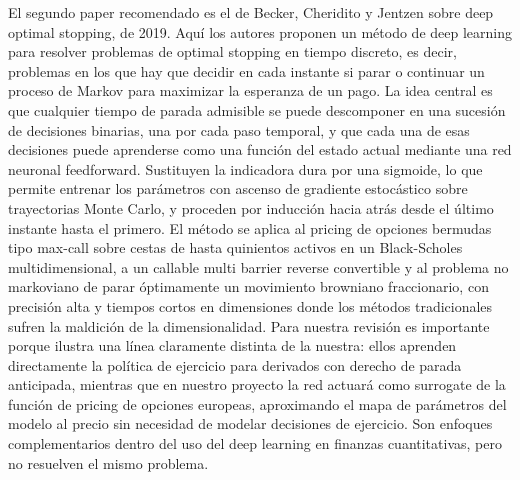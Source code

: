 \documentclass[11pt,a4paper]{article}
\begin{document}
El segundo paper recomendado es el de Becker, Cheridito y Jentzen sobre deep optimal stopping, de 2019. Aquí los autores proponen un método de deep learning para resolver problemas de optimal stopping en tiempo discreto, es decir, problemas en los que hay que decidir en cada instante si parar o continuar un proceso de Markov para maximizar la esperanza de un pago. La idea central es que cualquier tiempo de parada admisible se puede descomponer en una sucesión de decisiones binarias, una por cada paso temporal, y que cada una de esas decisiones puede aprenderse como una función del estado actual mediante una red neuronal feedforward. Sustituyen la indicadora dura por una sigmoide, lo que permite entrenar los parámetros con ascenso de gradiente estocástico sobre trayectorias Monte Carlo, y proceden por inducción hacia atrás desde el último instante hasta el primero. El método se aplica al pricing de opciones bermudas tipo max-call sobre cestas de hasta quinientos activos en un Black-Scholes multidimensional, a un callable multi barrier reverse convertible y al problema no markoviano de parar óptimamente un movimiento browniano fraccionario, con precisión alta y tiempos cortos en dimensiones donde los métodos tradicionales sufren la maldición de la dimensionalidad. Para nuestra revisión es importante porque ilustra una línea claramente distinta de la nuestra: ellos aprenden directamente la política de ejercicio para derivados con derecho de parada anticipada, mientras que en nuestro proyecto la red actuará como surrogate de la función de pricing de opciones europeas, aproximando el mapa de parámetros del modelo al precio sin necesidad de modelar decisiones de ejercicio. Son enfoques complementarios dentro del uso del deep learning en finanzas cuantitativas, pero no resuelven el mismo problema.
\end{document}
